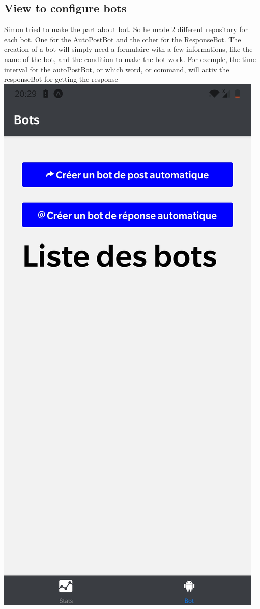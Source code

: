 \documentclass{article}
\begin{document}
\subsection{View to configure bots}
Simon tried to make the part about bot. So he made 2 different repository for each bot. One for the AutoPostBot and the other for the ResponseBot.
The creation of a bot will simply need a formulaire with a few informations, like the name of the bot, and the condition to make the bot work. For exemple, the time interval for the autoPostBot, or which word, or command, will activ the responseBot for getting the response
\includegraphics[height=1\textheight]{bots}
\end{document}
